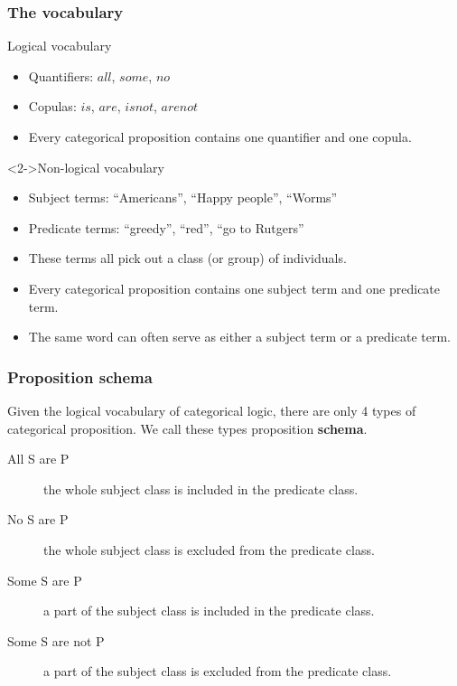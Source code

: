 \documentclass[10pt,letterpaper,xcolor=dvipsnames]{beamer}
\begin{document}
\begin{frame}
\frametitle{The vocabulary}

  \begin{block}{Logical vocabulary}
    \begin{itemize}
      \item Quantifiers: $all$, $some$, $no$
      \item Copulas: $is$, $are$, $is not$, $are not$
      \item Every categorical proposition contains one quantifier and one copula.
    \end{itemize}
  \end{block}
  
  \begin{block}<2->{Non-logical vocabulary}
    \begin{itemize}
      \item Subject terms: ``Americans'', ``Happy people'', ``Worms''
      \item Predicate terms: ``greedy'', ``red'', ``go to Rutgers''
      \item These terms all pick out a class (or group) of individuals.
      \item Every categorical proposition contains one subject term and one predicate term.
      \item The same word can often serve as either a subject term or a predicate term.
    \end{itemize}
  \end{block}
\end{frame}

\begin{frame}
  \frametitle{Proposition schema}
  
  Given the logical vocabulary of categorical logic, there are only 4 types of categorical proposition.  We call these types proposition \textbf{schema}.
  
  \begin{description}
    \item[All S are P] the whole subject class is included in the predicate class.
    \item[No S are P] the whole subject class is excluded from the predicate class.
    \item[Some S are P] a part of the subject class is included in the predicate class.
    \item[Some S are not P] a part of the subject class is excluded from the predicate class. 
  \end{description}

\end{frame}
\end{document}
